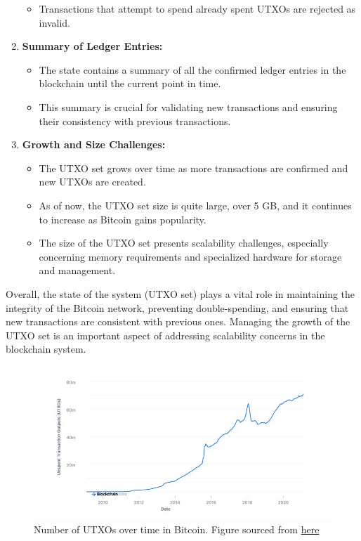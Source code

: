 \begin{enumerate}
\begin{itemize}
        \item Transactions that attempt to spend already spent UTXOs are rejected as invalid.
    \end{itemize}
    \item \textbf{Summary of Ledger Entries:}
    \begin{itemize}
        \item The state contains a summary of all the confirmed ledger entries in the blockchain until the current point in time.
        \item This summary is crucial for validating new transactions and ensuring their consistency with previous transactions.
    \end{itemize}
    \item \textbf{Growth and Size Challenges:}
    \begin{itemize}
        \item The UTXO set grows over time as more transactions are confirmed and new UTXOs are created.
        \item As of now, the UTXO set size is quite large, over 5 GB, and it continues to increase as Bitcoin gains popularity.
        \item The size of the UTXO set presents scalability challenges, especially concerning memory requirements and specialized hardware for storage and management.
    \end{itemize}
\end{enumerate}
Overall, the state of the system (UTXO set) plays a vital role in maintaining the integrity of the Bitcoin network, preventing double-spending, and ensuring that new transactions are consistent with previous ones. Managing the growth of the UTXO set is an important aspect of addressing scalability concerns in the blockchain system.

\begin{figure}[h!]
    \centering
    \includegraphics[width=0.6\linewidth]{Fig/05/F3}
    \caption{Number of UTXOs over time in Bitcoin. Figure sourced from \href{https://www.blockchain.com/explorer/charts/utxo-count}{here}}
    \label{fig:f3}
\end{figure}


